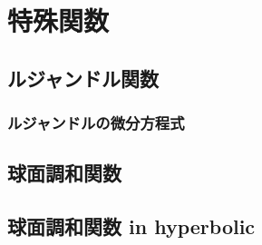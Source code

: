 \chapter{特殊関数}
\section{ルジャンドル関数}
\subsection{ルジャンドルの微分方程式}
\section{球面調和関数}
\section{球面調和関数 in hyperbolic}
